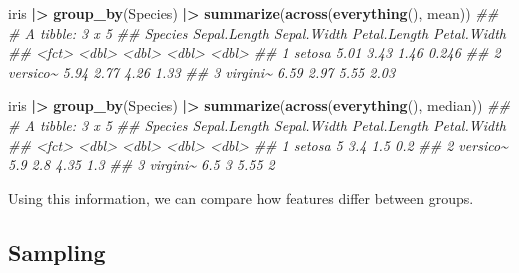\documentclass[
  notitlepage]{book}
\newenvironment{Shaded}{\begin{snugshade}}{\end{snugshade}}
\newcommand{\CommentTok}[1]{\textcolor[rgb]{0.56,0.35,0.01}{\textit{#1}}}
\newcommand{\ErrorTok}[1]{\textcolor[rgb]{0.64,0.00,0.00}{\textbf{#1}}}
\newcommand{\KeywordTok}[1]{\textcolor[rgb]{0.13,0.29,0.53}{\textbf{#1}}}
\newcommand{\NormalTok}[1]{#1}
\newcommand{\OperatorTok}[1]{\textcolor[rgb]{0.81,0.36,0.00}{\textbf{#1}}}
\newcommand{\StringTok}[1]{\textcolor[rgb]{0.31,0.60,0.02}{#1}}
\begin{document}
\begin{Shaded}
\begin{Highlighting}[]
\NormalTok{iris }\OperatorTok{|}\ErrorTok{\textgreater{}}\StringTok{ }
\StringTok{  }\KeywordTok{group\_by}\NormalTok{(Species) }\OperatorTok{|}\ErrorTok{\textgreater{}}\StringTok{ }
\StringTok{  }\KeywordTok{summarize}\NormalTok{(}\KeywordTok{across}\NormalTok{(}\KeywordTok{everything}\NormalTok{(), mean))}
\CommentTok{\#\# \# A tibble: 3 x 5}
\CommentTok{\#\#   Species  Sepal.Length Sepal.Width Petal.Length Petal.Width}
\CommentTok{\#\#   \textless{}fct\textgreater{}           \textless{}dbl\textgreater{}       \textless{}dbl\textgreater{}        \textless{}dbl\textgreater{}       \textless{}dbl\textgreater{}}
\CommentTok{\#\# 1 setosa           5.01        3.43         1.46       0.246}
\CommentTok{\#\# 2 versico\textasciitilde{}         5.94        2.77         4.26       1.33 }
\CommentTok{\#\# 3 virgini\textasciitilde{}         6.59        2.97         5.55       2.03}
\end{Highlighting}
\end{Shaded}

\begin{Shaded}
\begin{Highlighting}[]
\NormalTok{iris }\OperatorTok{|}\ErrorTok{\textgreater{}}\StringTok{ }
\StringTok{  }\KeywordTok{group\_by}\NormalTok{(Species) }\OperatorTok{|}\ErrorTok{\textgreater{}}\StringTok{ }
\StringTok{  }\KeywordTok{summarize}\NormalTok{(}\KeywordTok{across}\NormalTok{(}\KeywordTok{everything}\NormalTok{(), median))}
\CommentTok{\#\# \# A tibble: 3 x 5}
\CommentTok{\#\#   Species  Sepal.Length Sepal.Width Petal.Length Petal.Width}
\CommentTok{\#\#   \textless{}fct\textgreater{}           \textless{}dbl\textgreater{}       \textless{}dbl\textgreater{}        \textless{}dbl\textgreater{}       \textless{}dbl\textgreater{}}
\CommentTok{\#\# 1 setosa            5           3.4         1.5          0.2}
\CommentTok{\#\# 2 versico\textasciitilde{}          5.9         2.8         4.35         1.3}
\CommentTok{\#\# 3 virgini\textasciitilde{}          6.5         3           5.55         2}
\end{Highlighting}
\end{Shaded}

Using this information, we can compare how features differ between
groups.

\hypertarget{sampling}{%
\subsection{Sampling}\label{sampling}}
\end{document}
